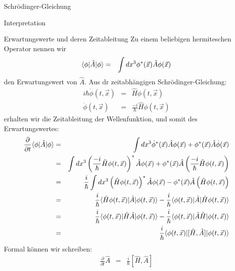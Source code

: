 \begin{chapter}{\titlestr}
\begin{section}{Schrödinger-Gleichung}
\begin{subsection}{Interpretation}
\begin{subsubsection}{Erwartungswerte und deren Zeitableitung}
Zu einem beliebigen hermiteschen Operator nennen wir
\begin{eqnarray*}
\langle\phi\rvert\hat{A}\lvert\phi\rangle &=& \int dx^3 \phi^*(\vec{x})\hat{A}\phi(\vec{x})
\end{eqnarray*}
den Erwartungswert von $\hat{A}$. Aus dr zeitabhängigen Schrödinger-Gleichung:
\begin{eqnarray*}
i\hbar \dot{\phi}(t,\vec{x}) &=& \hat{H}\phi(t,\vec{x})\\
\dot{\phi}(t,\vec{x}) &=& \frac{-i}{\hbar}\hat{H}\phi(t,\vec{x})
\end{eqnarray*}
erhalten wir die Zeitableitung der Wellenfunktion, und somit des Erwartungswertes:
\begin{eqnarray*}
\frac{\partial}{\partial t}\langle\phi\rvert\hat{A}\lvert\phi\rangle &=& \int dx^3 \dot{\phi}^*(\vec{x})\hat{A}\phi(\vec{x})+\phi^*(\vec{x})\hat{A}\dot{\phi}(\vec{x})\\
 &=& \int dx^3 \left(\frac{-i}{\hbar}\hat{H}\phi(t,\vec{x})\right)^*\hat{A}\phi(\vec{x})
+\phi^*(\vec{x})\hat{A}\left(\frac{-i}{\hbar}\hat{H}\phi(t,\vec{x})\right)\\
 &=& \frac{i}{\hbar}\int dx^3 \left(\hat{H}\phi(t,\vec{x})\right)^*\hat{A}\phi(\vec{x})
-\phi^*(\vec{x})\hat{A}\left(\hat{H}\phi(t,\vec{x})\right)\\
&=&\frac{i}{\hbar}\langle\hat{H}\phi(t,\vec{x})\rvert\hat{A}\lvert\phi(t,\vec{x})\rangle
-\frac{i}{\hbar}\langle\phi(t,\vec{x})\rvert\hat{A}\lvert\hat{H}\phi(t,\vec{x})\rangle\\
&=&\frac{i}{\hbar}\langle\phi(t,\vec{x})\rvert\hat{H}\hat{A}\lvert\phi(t,\vec{x})\rangle
-\frac{i}{\hbar}\langle\phi(t,\vec{x})\rvert\hat{A}\hat{H}\lvert\phi(t,\vec{x})\rangle\\
&=&\frac{i}{\hbar}\langle\phi(t,\vec{x})\rvert[\hat{H},\hat{A}]\lvert\phi(t,\vec{x})\rangle
\end{eqnarray*}
Formal können wir schreiben:
\begin{eqnarray*}
\frac{\partial}{\partial t}\hat{A} &=&\frac{i}{\hbar}[\hat{H},\hat{A}]
\end{eqnarray*}
\end{subsubsection}


\end{subsection}
\end{section}
\end{chapter}
